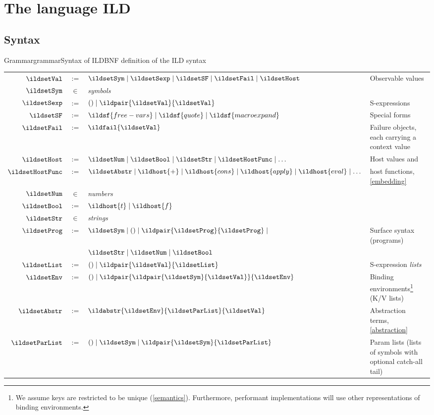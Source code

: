 \section{The language ILD}

\subsection{Syntax}
\label{syntax}
\begin{cfig}{Grammar}{grammar}{Syntax of ILD}{BNF definition of the ILD syntax}\label{syntax-grammar}
\begin{tabular}{r@{\;}c@{\;}l@{\qquad}l}
\(\ildsetVal\) & \(:=\) & \(\ildsetSym \mid \ildsetSexp \mid \ildsetSF \mid \ildsetFail \mid \ildsetHost\) & Observable values \\
\(\ildsetSym\) & \(\in\) & \emph{symbols} & \\
\(\ildsetSexp\) & \(:=\) & \(() \mid \ildpair{\ildsetVal}{\ildsetVal}\) & S-expressions \\
\(\ildsetSF\) & \(:=\) & \(\ildsf{free-vars} \mid \ildsf{quote} \mid \ildsf{macroexpand}\) & Special forms \\
\(\ildsetFail\) & \(:=\) & \(\ildfail{\ildsetVal}\) & Failure objects, each carrying a context value \\
\(\ildsetHost\) & \(:=\) & \(\ildsetNum \mid \ildsetBool \mid \ildsetStr \mid \ildsetHostFunc \mid \dots\) & Host values and \\
\(\ildsetHostFunc\) & \(:=\) & \(\ildsetAbstr \mid \ildhost{+} \mid \ildhost{cons} \mid \ildhost{apply} \mid \ildhost{eval} \mid \dots\) & host functions, \cref{embedding} \\
\(\ildsetNum\) & \(\in\) & \emph{numbers} & \\
\(\ildsetBool\) & \(:=\) & \(\ildhost{t} \mid \ildhost{f}\) & \\
\(\ildsetStr\) & \(\in\) & \emph{strings} & \\
\(\ildsetProg\) & \(:=\) & \(\ildsetSym \mid () \mid \ildpair{\ildsetProg}{\ildsetProg} \mid\) & Surface syntax (programs) \\
 & & \(\ildsetStr \mid \ildsetNum \mid \ildsetBool\) & \\
\(\ildsetList\) & \(:=\) & \(() \mid \ildpair{\ildsetVal}{\ildsetList}\) & S-expression \emph{lists} \\
\(\ildsetEnv\) & \(:=\) & \(() \mid \ildpair{\ildpair{\ildsetSym}{\ildsetVal}}{\ildsetEnv}\) & Binding environments\footnote{We assume keys are restricted to be unique (\cref{semantics}). Furthermore, performant implementations will use other representations of binding environments.} (K/V lists) \\
\(\ildsetAbstr\) & \(:=\) & \(\ildabstr{\ildsetEnv}{\ildsetParList}{\ildsetVal}\) & Abstraction terms, \cref{abstraction} \\
\(\ildsetParList\) & \(:=\) & \(() \mid \ildsetSym \mid \ildpair{\ildsetSym}{\ildsetParList}\) & Param lists (lists of symbols with optional catch-all tail) \\
\end{tabular}
\end{cfig}

